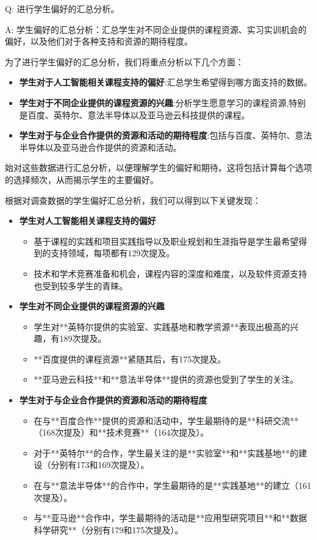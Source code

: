 
Q:
  进行学生偏好的汇总分析。

A:
学生偏好的汇总分析：汇总学生对不同企业提供的课程资源、实习实训机会的偏好，以及他们对于各种支持和资源的期待程度。

为了进行学生偏好的汇总分析，我们将重点分析以下几个方面：

\begin{itemize}
\item \textbf{学生对于人工智能相关课程支持的偏好}:汇总学生希望得到哪方面支持的数据。
\item \textbf{学生对于不同企业提供的课程资源的兴趣}:分析学生愿意学习的课程资源,特别是百度、英特尔、意法半导体以及亚马逊云科技提供的课程。
\item \textbf{学生对于与企业合作提供的资源和活动的期待程度}:包括与百度、英特尔、意法半导体以及亚马逊合作提供的资源和活动。
\end{itemize}

始对这些数据进行汇总分析，以便理解学生的偏好和期待。这将包括计算每个选项的选择频次，从而揭示学生的主要偏好。

根据对调查数据的学生偏好汇总分析，我们可以得到以下关键发现：
\begin{itemize}
\item \textbf{学生对人工智能相关课程支持的偏好}
\begin{itemize}
\item 基于课程的实践和项目实践指导以及职业规划和生涯指导是学生最希望得到的支持领域，每项都有129次提及。
\item 技术和学术竞赛准备和机会，课程内容的深度和难度，以及软件资源支持也受到较多学生的青睐。
\end{itemize}

\item \textbf{学生对不同企业提供的课程资源的兴趣}
\begin{itemize}
\item 学生对**英特尔提供的实验室、实践基地和教学资源**表现出极高的兴趣，有189次提及。
\item **百度提供的课程资源**紧随其后，有175次提及。
\item **亚马逊云科技**和**意法半导体**提供的资源也受到了学生的关注。
\end{itemize}

\item \textbf{学生对于与企业合作提供的资源和活动的期待程度}
\begin{itemize}
\item 在与**百度合作**提供的资源和活动中，学生最期待的是**科研交流**（168次提及）和**技术竞赛**（164次提及）。
\item 对于**英特尔**的合作，学生最关注的是**实验室**和**实践基地**的建设（分别有173和169次提及）。
\item 在与**意法半导体**的合作中，学生最期待的是**实践基地**的建立（161次提及）。
\item 与**亚马逊**合作中，学生最期待的活动是**应用型研究项目**和**数据科学研究**（分别有179和175次提及）。
\end{itemize}

\end{itemize}

